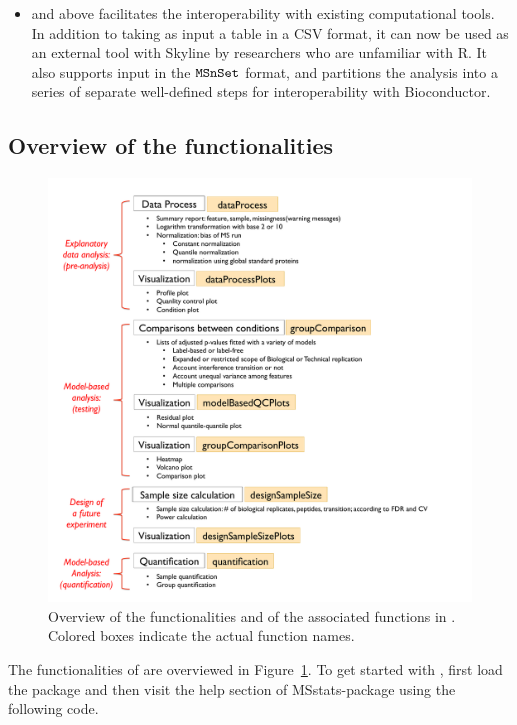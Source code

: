 \documentclass[11pt]{article}
\def\figref#1{Figure~\ref{fig:#1}}
\begin{document}
\begin{itemize}
\begin{itemize}
\end{itemize}

\item {} and above facilitates the interoperability with existing computational tools. In addition to taking as input a table in a CSV format, it can now be used as an external tool with Skyline by researchers who are unfamiliar with R. It also supports input in the $\tt{MSnSet}$ format, and partitions the analysis into a series of separate well-defined steps for interoperability with Bioconductor.

\end{itemize}


\subsection*{Overview of the functionalities}
\begin{figure}[!h]
\centering 
\includegraphics[scale=3]{MSstatsOverviewDiagram.pdf}
\vspace{-0.3cm}
\caption{\small Overview of the functionalities and of the associated functions in \m. Colored boxes indicate the actual function names.
\label{fig:overview}}
\end{figure}


The functionalities of \m are overviewed in \figref{overview}. To get started with \m, first load the package and then visit the help section of MSstats-package using the following code.
\end{document}
